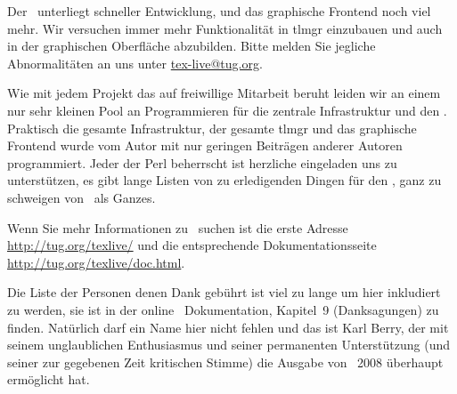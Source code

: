Der \tlmgr\ unterliegt schneller Entwicklung, und das graphische
Frontend noch viel mehr. Wir versuchen immer mehr Funktionalität in
tlmgr einzubauen und auch in der graphischen Oberfläche abzubilden.
Bitte melden Sie jegliche Abnormalitäten an uns unter 
\url{tex-live@tug.org}.

Wie mit jedem Projekt das auf freiwillige Mitarbeit beruht leiden wir
an einem nur sehr kleinen Pool an Programmieren für die zentrale
Infrastruktur und den \tlmgr. Praktisch die gesamte Infrastruktur,
der gesamte tlmgr und das graphische Frontend wurde vom Autor mit nur 
geringen Beiträgen anderer Autoren programmiert. Jeder der Perl 
beherrscht ist herzliche eingeladen uns zu unterstützen, es gibt
lange Listen von zu erledigenden Dingen für den \tlmgr, 
ganz zu schweigen von \tl\ als Ganzes.

Wenn Sie mehr Informationen zu \tl\ suchen ist die erste Adresse
\url{http://tug.org/texlive/} und die entsprechende Dokumentationsseite
\url{http://tug.org/texlive/doc.html}.

Die Liste der Personen denen Dank gebührt ist viel zu lange um hier
inkludiert zu werden, sie ist in der online \tl\ Dokumentation, Kapitel~9
(Danksagungen) zu finden. Natürlich darf ein Name hier nicht fehlen und
das ist Karl Berry, der mit seinem unglaublichen Enthusiasmus und seiner
permanenten Unterstützung (und seiner zur gegebenen Zeit kritischen Stimme)
die Ausgabe von \tl~2008 überhaupt ermöglicht hat.



%
%
